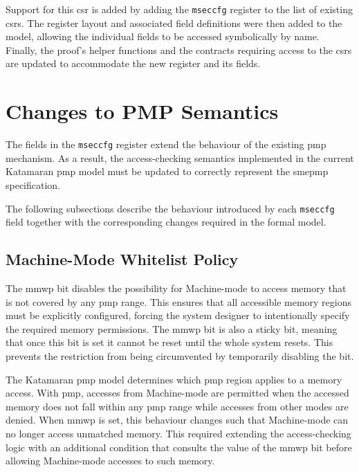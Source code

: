 Support for this \gls{csr} is added by adding the \texttt{mseccfg} register to the list of existing \glspl{csr}.
The register layout and associated field definitions were then added to the model, allowing the individual fields to be accessed symbolically by name.
Finally, the proof's helper functions and the contracts requiring access to the \glspl{csr} are updated to accommodate the new register and its fields. 

\section{Changes to PMP Semantics}
The fields in the \texttt{mseccfg} register extend the behaviour of the existing \gls{pmp} mechanism.
As a result, the access-checking semantics implemented in the current Katamaran \gls{pmp} model must be updated to correctly represent the \gls{smepmp} specification.

The following subsections describe the behaviour introduced by each \texttt{mseccfg} field together with the corresponding changes required in the formal model.

\subsection{Machine-Mode Whitelist Policy}
The \gls{mmwp} bit disables the possibility for Machine-mode to access memory that is not covered by any \gls{pmp} range.
This ensures that all accessible memory regions must be explicitly configured, forcing the system designer to intentionally specify the required memory permissions.
The \gls{mmwp} bit is also a sticky bit, meaning that once this bit is set it cannot be reset until the whole system resets.
This prevents the restriction from being circumvented by temporarily disabling the bit.

The Katamaran \gls{pmp} model determines which \gls{pmp} region applies to a memory access.
With \gls{pmp}, accesses from Machine-mode are permitted when the accessed memory does not fall within any \gls{pmp} range while accesses from other modes are denied.
When \gls{mmwp} is set, this behaviour changes such that Machine-mode can no longer access unmatched memory.
This required extending the access-checking logic with an additional condition that consults the value of the \gls{mmwp} bit before allowing Machine-mode accesses to such memory.

